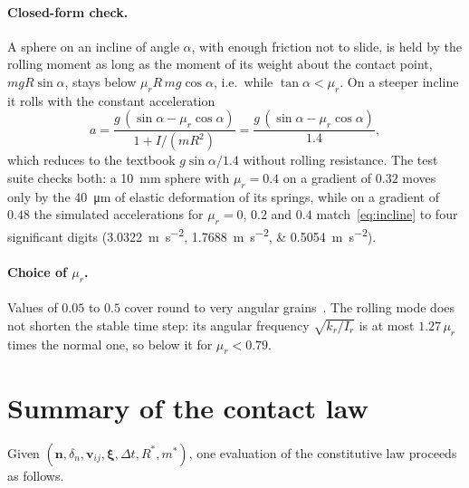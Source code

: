 \paragraph{Closed-form check.}  A sphere on an incline of angle $\alpha$, with
enough friction not to slide, is held by the rolling moment as long as the
moment of its weight about the contact point, $mgR\sin\alpha$, stays below
$\mu_{r}R\,mg\cos\alpha$, i.e.\ while $\tan\alpha<\mu_{r}$.  On a steeper
incline it rolls with the constant acceleration
\begin{equation}
  a = \frac{g\,(\sin\alpha - \mu_{r}\cos\alpha)}{1 + I/(mR^{2})}
    = \frac{g\,(\sin\alpha - \mu_{r}\cos\alpha)}{1.4} ,
  \label{eq:incline}
\end{equation}
which reduces to the textbook $g\sin\alpha/1.4$ without rolling resistance.
The test suite checks both: a \qty{10}{\milli\metre} sphere with $\mu_{r}=0.4$
on a gradient of $0.32$ moves only by the \qty{40}{\micro\metre} of elastic
deformation of its springs, while on a gradient of $0.48$ the simulated
accelerations for $\mu_{r}=0$, $0.2$ and $0.4$ match~\eqref{eq:incline} to four
significant digits (\qtylist{3.0322;1.7688;0.5054}{\metre\per\second\squared}).

\paragraph{Choice of $\mu_{r}$.}  Values of $0.05$ to $0.5$ cover round to very
angular grains~\cite{ai2011}.  The rolling mode does not shorten the stable time
step: its angular frequency $\sqrt{k_{r}/I_{r}}$ is at most $1.27\,\mu_{r}$
times the normal one, so below it for $\mu_{r}<0.79$.

\section{Summary of the contact law}
\label{sec:contact-summary}

Given $(\mathbf{n},\delta_{n},\mathbf{v}_{ij},\boldsymbol{\xi},\Delta t,
R^{*},m^{*})$, one evaluation of the constitutive law proceeds as follows.

